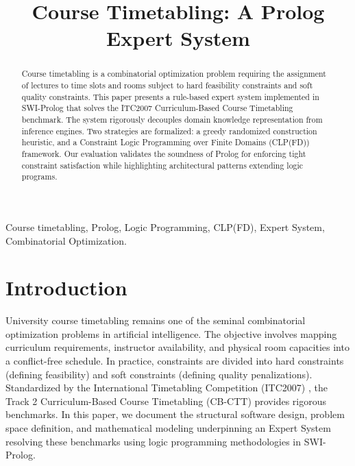 \documentclass[conference]{IEEEtran}
\begin{document}
\title{Course Timetabling: A Prolog Expert System}

\author{
\and
{}
\and
{}
}

\maketitle

\begin{abstract}
Course timetabling is a combinatorial optimization problem requiring the assignment of lectures to time slots and rooms subject to hard feasibility constraints and soft quality constraints. This paper presents a rule-based expert system implemented in SWI-Prolog that solves the ITC2007 Curriculum-Based Course Timetabling benchmark. The system rigorously decouples domain knowledge representation from inference engines. Two strategies are formalized: a greedy randomized construction heuristic, and a Constraint Logic Programming over Finite Domains (CLP(FD)) framework. Our evaluation validates the soundness of Prolog for enforcing tight constraint satisfaction while highlighting architectural patterns extending logic programs.
\end{abstract}

\begin{IEEEkeywords}
Course timetabling, Prolog, Logic Programming, CLP(FD), Expert System, Combinatorial Optimization.
\end{IEEEkeywords}

\section{Introduction}
University course timetabling remains one of the seminal combinatorial optimization problems in artificial intelligence. The objective involves mapping curriculum requirements, instructor availability, and physical room capacities into a conflict-free schedule. In practice, constraints are divided into hard constraints (defining feasibility) and soft constraints (defining quality penalizations). Standardized by the International Timetabling Competition (ITC2007) \cite{itc2007}, the Track 2 Curriculum-Based Course Timetabling (CB-CTT) provides rigorous benchmarks. In this paper, we document the structural software design, problem space definition, and mathematical modeling underpinning an Expert System resolving these benchmarks using logic programming methodologies in SWI-Prolog.
\end{document}
